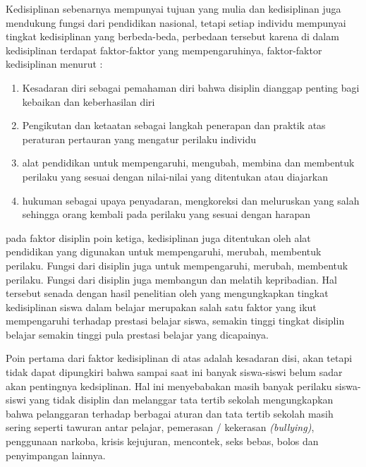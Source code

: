 \documentclass[f4paper,12pt, left=3cm,right=2cm,bottom=2cm, bahasa]{article}
\begin{document}
Kedisiplinan sebenarnya mempunyai tujuan yang mulia dan kedisiplinan juga mendukung fungsi dari pendidikan nasional, 
tetapi setiap individu mempunyai tingkat kedisiplinan yang berbeda-beda, perbedaan tersebut karena di dalam kedisiplinan terdapat faktor-faktor yang mempengaruhinya, faktor-faktor kedisiplinan menurut \cite{tu2004peran} :
\begin{enumerate}
  \item Kesadaran diri sebagai pemahaman diri bahwa disiplin dianggap penting bagi kebaikan dan keberhasilan diri
  \item Pengikutan dan ketaatan sebagai langkah penerapan dan praktik atas peraturan pertauran yang mengatur perilaku individu
  \item alat pendidikan untuk mempengaruhi, mengubah, membina dan membentuk perilaku yang sesuai dengan nilai-nilai yang ditentukan atau diajarkan
  \item hukuman sebagai upaya penyadaran, mengkoreksi dan meluruskan yang salah sehingga orang kembali pada perilaku yang sesuai dengan harapan 
\end{enumerate}

pada faktor disiplin poin ketiga, kedisiplinan juga ditentukan oleh alat pendidikan yang digunakan untuk mempengaruhi, merubah, membentuk perilaku. Fungsi dari disiplin juga untuk mempengaruhi, merubah, membentuk perilaku. Fungsi dari disiplin juga membangun dan melatih kepribadian. Hal tersebut senada dengan hasil penelitian oleh \cite{Sumantri_2010}  yang mengungkapkan tingkat kedisiplinan siswa dalam belajar merupakan salah satu faktor yang ikut mempengaruhi terhadap prestasi belajar siswa, semakin tinggi tingkat disiplin belajar semakin tinggi pula prestasi belajar yang dicapainya. 

Poin pertama dari faktor kedisiplinan di atas adalah kesadaran disi, akan tetapi tidak dapat dipungkiri bahwa sampai saat ini banyak siswa-siswi belum sadar akan pentingnya kedsiplinan. Hal ini menyebabakan masih banyak perilaku siswa-siswi yang tidak disiplin dan melanggar tata tertib sekolah \cite{Samani_Hariyanto} mengungkapkan bahwa pelanggaran terhadap berbagai aturan dan tata tertib sekolah masih sering seperti tawuran antar pelajar, pemerasan / kekerasan \textit{(bullying)}, penggunaan narkoba, krisis kejujuran, mencontek, seks bebas, bolos dan penyimpangan lainnya. 
\end{document}

